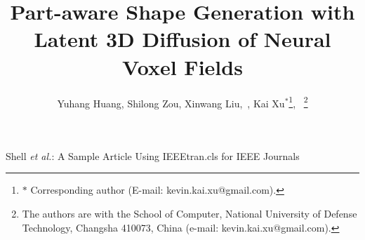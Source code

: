 \documentclass[lettersize,journal]{IEEEtran}
\begin{document}
\title{Part-aware Shape Generation with Latent 3D Diffusion of Neural Voxel Fields}

\author{Yuhang Huang, Shilong Zou, Xinwang Liu,~, Kai Xu$^{*}$\thanks{$*$ Corresponding author (E-mail: kevin.kai.xu@gmail.com).},~
\thanks{The authors are with the School of Computer, National University of Defense Technology, Changsha 410073, China (e-mail: kevin.kai.xu@gmail.com). %
}
}

%
{Shell \MakeLowercase{\textit{et al.}}: A Sample Article Using IEEEtran.cls for IEEE Journals}


\end{document}
